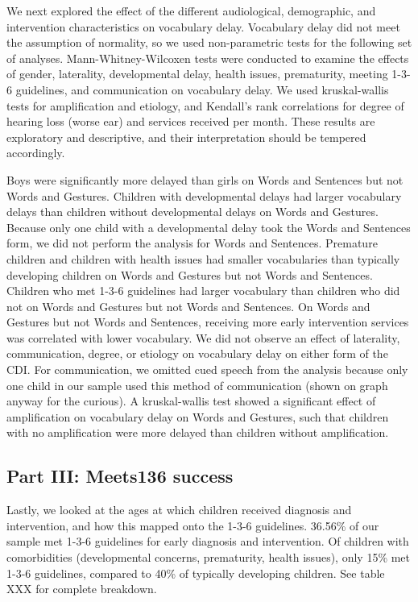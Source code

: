 \documentclass[english,man,floatsintext]{apa6}
\begin{document}
We next explored the effect of the different audiological, demographic, and intervention characteristics on vocabulary delay. Vocabulary delay did not meet the assumption of normality, so we used non-parametric tests for the following set of analyses. Mann-Whitney-Wilcoxen tests were conducted to examine the effects of gender, laterality, developmental delay, health issues, prematurity, meeting 1-3-6 guidelines, and communication on vocabulary delay. We used kruskal-wallis tests for amplification and etiology, and Kendall's rank correlations for degree of hearing loss (worse ear) and services received per month. These results are exploratory and descriptive, and their interpretation should be tempered accordingly.

Boys were significantly more delayed than girls on Words and Sentences but not Words and Gestures. Children with developmental delays had larger vocabulary delays than children without developmental delays on Words and Gestures. Because only one child with a developmental delay took the Words and Sentences form, we did not perform the analysis for Words and Sentences. Premature children and children with health issues had smaller vocabularies than typically developing children on Words and Gestures but not Words and Sentences. Children who met 1-3-6 guidelines had larger vocabulary than children who did not on Words and Gestures but not Words and Sentences. On Words and Gestures but not Words and Sentences, receiving more early intervention services was correlated with lower vocabulary. We did not observe an effect of laterality, communication, degree, or etiology on vocabulary delay on either form of the CDI. For communication, we omitted cued speech from the analysis because only one child in our sample used this method of communication (shown on graph anyway for the curious). A kruskal-wallis test showed a significant effect of amplification on vocabulary delay on Words and Gestures, such that children with no amplification were more delayed than children without amplification.

\hypertarget{part-iii-meets136-success}{%
\subsection{Part III: Meets136 success}\label{part-iii-meets136-success}}

Lastly, we looked at the ages at which children received diagnosis and intervention, and how this mapped onto the 1-3-6 guidelines. 36.56\% of our sample met 1-3-6 guidelines for early diagnosis and intervention. Of children with comorbidities (developmental concerns, prematurity, health issues), only 15\% met 1-3-6 guidelines, compared to 40\% of typically developing children. See table XXX for complete breakdown.
\end{document}
